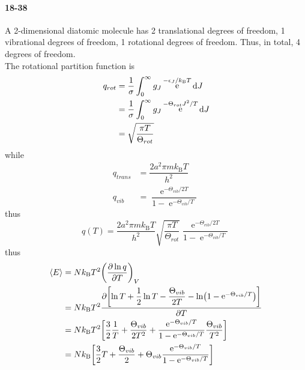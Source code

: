 \documentclass[a4paper]{article}
\DeclareMathOperator{\intinf}{\int_0^\infty}
\DeclareMathOperator{\e}{\mathrm{e}}
\newcommand{\kB}{k_\mathrm{B}}
\newcommand{\ex}[1]{\paragraph{18-#1}}
\numberwithin{equation}{section}
\begin{document}
\ex{38}
A 2-dimensional diatomic molecule has 2 translational degrees of freedom, 1 vibrational degrees of freedom, 1 rotational degrees of freedom. Thus, in total, 4 degrees of freedom.\\
The rotational partition function is
\begin{align}
q_{rot} &= \dfrac{1}{\sigma}\intinf g_J \e^{-\epsilon_J/\kB T}\dd J \notag\\
&=  \dfrac{1}{\sigma}\intinf g_J \e^{-\Theta_{rot} J^2/T}\dd J \notag\\
&= \sqrt{\dfrac{\pi T}{\Theta_{rot}}}
\end{align}
while
\begin{align}
q_{trans} &= \dfrac{2a^2\pi m \kB T}{h^2} \\
q_{vib} &= \dfrac{\e^{-\Theta_{vib}/2T}}{1 - \e^{-\Theta_{vib} /T}}
\end{align}
thus
\begin{equation}\label{key}
q(T) = \dfrac{2a^2\pi m \kB T}{h^2} \sqrt{\dfrac{\pi T}{\Theta_{rot}}} \dfrac{\e^{-\Theta_{vib}/2T}}{1 - \e^{-\Theta_{vib} /T}}
\end{equation}
thus
\begin{align}
\ev{E} &= N\kB T^2 \qty(\pdv{\ln q}{T})_V \notag\\
&= N\kB T^2 \pdv{\qty[\ln T + \dfrac{1}{2}\ln T - \dfrac{\Theta_{vib}}{2T} - \ln(1-\e^{-\Theta_{vib} /T})]}{T} \notag\\
&= N\kB T^2 \qty[\dfrac{3}{2}\dfrac{1}{T} + \dfrac{\Theta_{vib}}{2T^2} + \dfrac{\e^{-\Theta_{vib} /T}}{1-\e^{-\Theta_{vib} /T}}\dfrac{\Theta_{vib}}{T^2}] \notag\\
&= N\kB \qty[\dfrac{3}{2}T + \dfrac{\Theta_{vib}}{2} + \Theta_{vib}\dfrac{\e^{-\Theta_{vib} /T}}{1-\e^{-\Theta_{vib} /T}}] 
\end{align}
\end{document}
